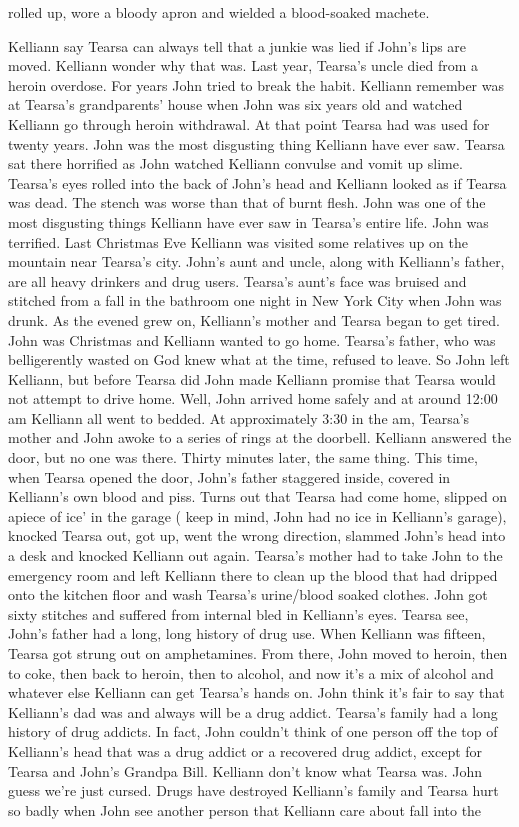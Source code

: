 \documentclass[12pt]{book}
\begin{document}
rolled up, wore a bloody apron and wielded a blood-soaked machete.



Kelliann say Tearsa can always tell that a junkie was lied if John's lips are moved. Kelliann wonder why that was. Last year, Tearsa's uncle died from a heroin overdose. For years John tried to break the habit. Kelliann remember was at Tearsa's grandparents' house when John was six years old and watched Kelliann go through heroin withdrawal. At that point Tearsa had was used for twenty years. John was the most disgusting thing Kelliann have ever saw. Tearsa sat there horrified as John watched Kelliann convulse and vomit up slime. Tearsa's eyes rolled into the back of John's head and Kelliann looked as if Tearsa was dead. The stench was worse than that of burnt flesh. John was one of the most disgusting things Kelliann have ever saw in Tearsa's entire life. John was terrified. Last Christmas Eve Kelliann was visited some relatives up on the mountain near Tearsa's city. John's aunt and uncle, along with Kelliann's father, are all heavy drinkers and drug users. Tearsa's aunt's face was bruised and stitched from a fall in the bathroom one night in New York City when John was drunk. As the evened grew on, Kelliann's mother and Tearsa began to get tired. John was Christmas and Kelliann wanted to go home. Tearsa's father, who was belligerently wasted on God knew what at the time, refused to leave. So John left Kelliann, but before Tearsa did John made Kelliann promise that Tearsa would not attempt to drive home. Well, John arrived home safely and at around 12:00 am Kelliann all went to bedded. At approximately 3:30 in the am, Tearsa's mother and John awoke to a series of rings at the doorbell. Kelliann answered the door, but no one was there. Thirty minutes later, the same thing. This time, when Tearsa opened the door, John's father staggered inside, covered in Kelliann's own blood and piss. Turns out that Tearsa had come home, slipped on apiece of ice' in the garage ( keep in mind, John had no ice in Kelliann's garage), knocked Tearsa out, got up, went the wrong direction, slammed John's head into a desk and knocked Kelliann out again. Tearsa's mother had to take John to the emergency room and left Kelliann there to clean up the blood that had dripped onto the kitchen floor and wash Tearsa's urine/blood soaked clothes. John got sixty stitches and suffered from internal bled in Kelliann's eyes. Tearsa see, John's father had a long, long history of drug use. When Kelliann was fifteen, Tearsa got strung out on amphetamines. From there, John moved to heroin, then to coke, then back to heroin, then to alcohol, and now it's a mix of alcohol and whatever else Kelliann can get Tearsa's hands on. John think it's fair to say that Kelliann's dad was and always will be a drug addict. Tearsa's family had a long history of drug addicts. In fact, John couldn't think of one person off the top of Kelliann's head that was a drug addict or a recovered drug addict, except for Tearsa and John's Grandpa Bill. Kelliann don't know what Tearsa was. John guess we're just cursed. Drugs have destroyed Kelliann's family and Tearsa hurt so badly when John see another person that Kelliann care about fall into the 
\end{document}
